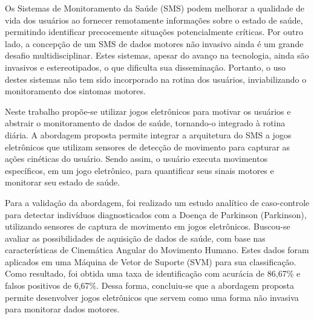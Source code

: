 


Os Sistemas de Monitoramento da Saúde (SMS) podem melhorar a qualidade de vida dos usuários ao fornecer remotamente informações sobre o estado de saúde, permitindo identificar precocemente situações potencialmente críticas. Por outro lado, a concepção de um SMS de dados motores não invasivo ainda é um grande desafio multidisciplinar. Estes sistemas, apesar do avanço na tecnologia, ainda são invasivos e estereotipados, o que dificulta sua disseminação. Portanto, o uso destes sistemas não tem sido incorporado na rotina dos usuários, inviabilizando o monitoramento dos sintomas motores. 

Neste trabalho propõe-se utilizar jogos eletrônicos para motivar os usuários e abstrair o monitoramento de dados de saúde, tornando-o integrado à rotina diária. A abordagem proposta permite integrar a arquitetura do SMS a jogos eletrônicos que utilizam sensores de detecção de movimento para capturar as ações cinéticas do usuário. Sendo assim, o usuário executa movimentos específicos, em um jogo eletrônico, para quantificar seus sinais motores e monitorar seu estado de saúde.

Para a validação da abordagem, foi realizado um estudo analítico de caso-controle para detectar indivíduos diagnosticados com a Doença de Parkinson (Parkinson), utilizando sensores de captura de movimento em jogos eletrônicos. Buscou-se avaliar as possibilidades de aquisição de dados de saúde, com base nas características de Cinemática Angular do Movimento Humano. Estes dados foram aplicados em uma Máquina de Vetor de Suporte (SVM) para sua classificação. Como resultado, foi obtida uma taxa de identificação com acurácia de 86,67\% e falsos positivos de 6,67\%. Dessa forma, concluiu-se que a abordagem proposta permite desenvolver jogos eletrônicos que servem como uma forma não invasiva para monitorar dados motores.



